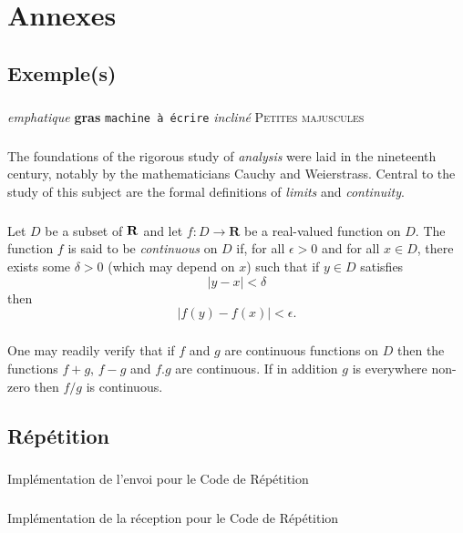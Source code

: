 %
\appendix{}
%
\chapter{Annexes}
%
    \section{Exemple(s)}
%
        \paragraph{}
\emph{emphatique}
\textbf{gras}
\texttt{machine à écrire}
\textsl{incliné}
\textsc{Petites majuscules}
%
        \paragraph{}
The foundations of the rigorous study of \emph{analysis}
were laid in the nineteenth century, notably by the
mathematicians Cauchy and Weierstrass. Central to the
study of this subject are the formal definitions of
\emph{limits} and \emph{continuity}.
%
        \paragraph{}
Let $D$ be a subset of $\bf R$ and let
$f \colon D \to \mathbf{R}$ be a real-valued function on
$D$. The function $f$ is said to be \emph{continuous} on
$D$ if, for all $\epsilon > 0$ and for all $x \in D$,
there exists some $\delta > 0$ (which may depend on $x$)
such that if $y \in D$ satisfies
\[ |y - x| < \delta \]
then
\[ |f(y) - f(x)| < \epsilon. \]
%
        \paragraph{}
One may readily verify that if $f$ and $g$ are continuous
functions on $D$ then the functions $f+g$, $f-g$ and
$f.g$ are continuous. If in addition $g$ is everywhere
non-zero then $f/g$ is continuous.
%
    \clearpage
%
%
%
    \section{Répétition}
%
        \paragraph{}
Implémentation de l'envoi pour le Code de Répétition

    \clearpage
%
        \paragraph{}
Implémentation de la réception pour le Code de Répétition

%
    \clearpage
%
